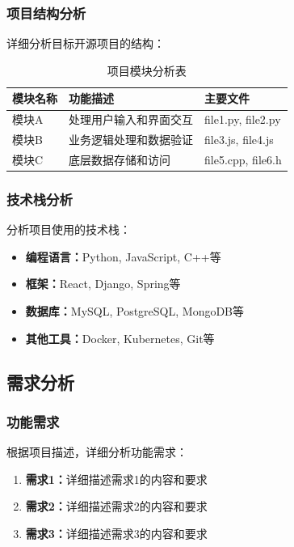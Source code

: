 \documentclass[a4paper,12pt]{article}
\begin{document}
\subsubsection{项目结构分析}
详细分析目标开源项目的结构：

\begin{table}[H]
\centering
\begin{tabular}{|l|l|l|}
\hline
\textbf{模块名称} & \textbf{功能描述} & \textbf{主要文件} \\
\hline
模块A & 处理用户输入和界面交互 & file1.py, file2.py \\
\hline
模块B & 业务逻辑处理和数据验证 & file3.js, file4.js \\
\hline
模块C & 底层数据存储和访问 & file5.cpp, file6.h \\
\hline
\end{tabular}
\caption{项目模块分析表}
\end{table}

\subsubsection{技术栈分析}
分析项目使用的技术栈：
\begin{itemize}
    \item \textbf{编程语言：}Python, JavaScript, C++等
    \item \textbf{框架：}React, Django, Spring等
    \item \textbf{数据库：}MySQL, PostgreSQL, MongoDB等
    \item \textbf{其他工具：}Docker, Kubernetes, Git等
\end{itemize}

\subsection{需求分析}

\subsubsection{功能需求}
根据项目描述，详细分析功能需求：

\begin{enumerate}
    \item \textbf{需求1：}详细描述需求1的内容和要求
    \item \textbf{需求2：}详细描述需求2的内容和要求
    \item \textbf{需求3：}详细描述需求3的内容和要求
\end{enumerate}
\end{document}
